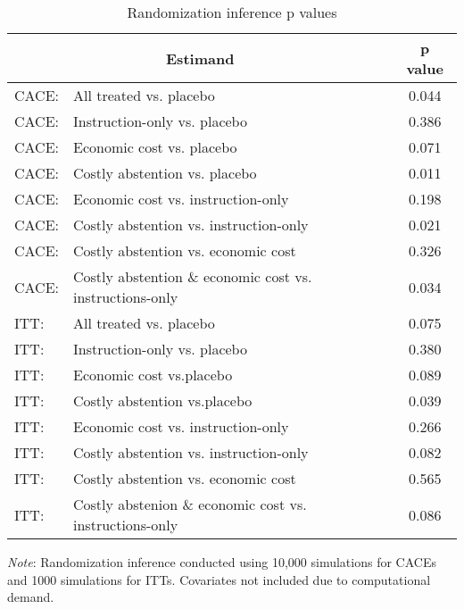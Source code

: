 \begin{table}[H]
\singlespace
\centering
\begin{tabular}{@{}llc@{}}
\toprule
\multicolumn{2}{c}{Estimand}          & p value \\ \midrule
CACE: & All treated vs. placebo       & 0.044   \\
CACE: & Instruction-only vs. placebo  & 0.386   \\
CACE: & Economic cost vs. placebo     & 0.071   \\
CACE: & Costly abstention vs. placebo & 0.011   \\
CACE: & Economic cost vs. instruction-only &   0.198 \\
CACE: & Costly abstention vs. instruction-only &  0.021 \\
CACE: & Costly abstention vs. economic cost & 0.326  \\
CACE: & Costly abstention  \& economic cost vs. instructions-only & 0.034 \\
ITT:  & All treated vs. placebo       & 0.075   \\
ITT:  & Instruction-only vs. placebo  & 0.380   \\
ITT:  & Economic cost vs.placebo     & 0.089   \\
ITT:  & Costly abstention vs.placebo & 0.039   \\ 
ITT: & Economic cost vs. instruction-only &   0.266 \\
ITT: & Costly abstention vs. instruction-only &  0.082 \\
ITT: & Costly abstention vs. economic cost & 0.565  \\
ITT: & Costly abstenion  \& economic cost vs. instructions-only & 0.086 \\
\bottomrule
\end{tabular}
\caption{Randomization inference p values}
\label{tab: ri}
\vspace{1mm}
{\textit{Note}: Randomization inference conducted using 10,000 simulations for CACEs and 1000 simulations for ITTs. Covariates not included due to computational demand.\par}
\end{table}


